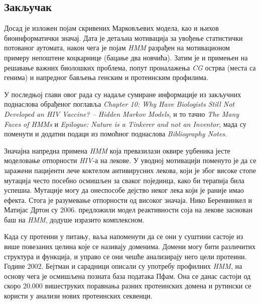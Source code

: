 \documentclass[12pt,oneside]{memoir}
\begin{document}
\begin{CJK}{UTF8}{ipxm}
\chapter{Закључак}
Досад је изложен појам скривених Марковљевих модела, као и њихов биоинформатички значај. Дата је детаљна мотивација за увођење статистички потованог аутомата, након чега је појам \textit{HMM} разрађен на мотивационом примеру непоштене коцкарнице (бацање два новчића). Затим је и примењен на решавање важних биолошких проблема, попут проналажења \textit{CG} острва (места са генима) и напредног бављења генским и протеинским профилима.

У последњој глави овог рада су надаље сумиране информације из закључних поднаслова обрађеног поглавља \textit{Chapter 10: Why Have Biologists Still Not Developed an HIV Vaccine? -- Hidden Markov Models}, и то тачно \textit{The Many Faces of HMMs} и \textit{Epilogue: Nature is a Tinkerer and not an Inventor}, мада су поменути и додатни подаци из помоћног поднаслова \textit{Bibliography Notes}.

Значајна напредна примена \textit{HMM} која превазилази оквире уџбеника јесте моделовање отпорности \textit{HIV}-а на лекове. У уводној мотивацији поменуто је да се заражени пацијенти лече коктелом антивирусних лекова, који је због високе стопе мутација често посебно осмишљен за сваког појединца, како би терапија била успешна. Мутације могу да онеспособе дејство неког лека који је раније имао ефекта. Стога је разумевање отпорности од високог значаја. Нико Беренвинкел и Матијас Дртон су 2006. предложили модел реактивности соја на лекове заснован баш на \textit{HMM}, додуше изразито комплексном\cite{beerenwinkel2007}.

Када су протеини у питању, ваља напоменути да се они у суштини састоје из више повезаних целина које се називају доменима. Домени могу бити различитих структура и функција, и управо се они чешће анализирају него цели протеини. Године 2002. Бејтман и сарадници описали су употребу профилних \textit{HMM}, на основу чега је осмишљена позната база података Пфам\cite{bateman2002}. Она се данас састоји од скоро 20.000 вишеструких поравнања разних протеинских домена и рутински се користи у анализи нових протеинских секвенци\cite{pfam}.


\end{CJK}
\end{document}
